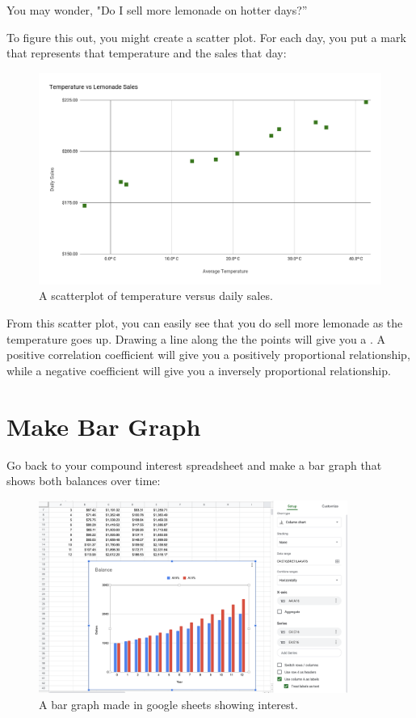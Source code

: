 You may wonder, "Do I sell more lemonade on hotter days?''

To figure this out, you might create a scatter plot.  For each day, you put a mark that
represents that temperature and the sales that day:

\begin{figure}[htbp]
    \centering
    \includegraphics[width=\textwidth]{LemonadeScatter.png}
    \caption{A scatterplot of temperature versus daily sales.}
    \label{fig:scatterplot}
\end{figure}

From this scatter plot, you can easily see that you do sell more
lemonade as the temperature goes up. 
Drawing a  line along the the points will give you a . A positive correlation coefficient will give you a positively proportional relationship, while a negative coefficient will give you a inversely proportional relationship.

\section{Make Bar Graph}

Go back to your compound interest spreadsheet and make a bar graph
that shows both balances over time:
\begin{figure}[htbp]
    \centering
    \includegraphics[width=0.9\textwidth]{InterestGraph.png}
    \caption{A bar graph made in google sheets showing interest.}
    \label{fig:spreadsheetBar}
\end{figure}

